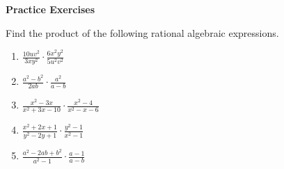 \textbf{Practice Exercises}

\vspce

Find the product of the following rational algebraic expressions. 

\vspce

\begin{enumerate}[label = \arabic*. ]

\item \hspce $\displaystyle \frac{10uv^2}{3xy^2} \cdot \frac{6x^2y^2}{5u^2v^2}$ 
\vspce
\item \hspce $\displaystyle \frac{a^2-b^2}{2ab} \cdot \frac{a^2}{a-b}$ 
\vspce
\item \hspce $\displaystyle \frac{x^2-3x}{x^{2}+3x-10} \cdot \frac{x^2-4}{x^2-x-6}$
\vspce
\item \hspce $\displaystyle \frac{x^2+2x+1}{y^{2}-2y+1} \cdot \frac{y^2-1}{x^{2}-1}$
\vspce
\item \hspce $\displaystyle \frac{a^2-2ab+b^2}{a^2-1} \cdot \frac{a-1}{a-b}$

\end{enumerate}